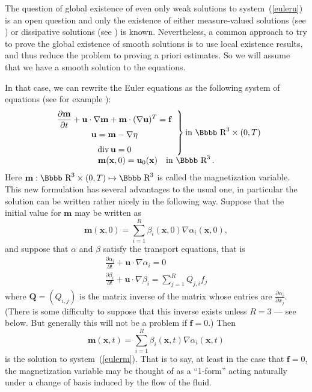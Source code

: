 \documentclass[12pt,twoside]{article}
\renewcommand {\div}{{\rm div}\,}
\newcommand {\rdd}{\mbox{\Bbbb R}}
\newcommand {\bu}{{\mathbf{u}}}
\newcommand {\bff}{{\mathbf{f}}}
\newcommand {\bx}{{\mathbf{x}}}
\newcommand {\bm}{{\mathbf{m}}}
\newcommand {\bQ}{{\mathbf{Q}}}
\newcommand {\pder}[2]{\frac {\partial #1}{\partial #2}}
\begin{document}
The question of global existence of even only weak solutions to 
system~(\ref{euleru}) is an open question and only the existence of either 
measure-valued solutions (see \cite{DPMa}) or dissipative solutions (see
\cite{Lio}) is known. Nevertheless, a common approach to try to prove 
the global existence of smooth solutions is to use local existence results,
and thus reduce the problem to proving a priori estimates.  So we will
assume that we have a smooth solution to the equations.

In that case, we can rewrite the Euler equations as the following system
of equations (see for example \cite{Ch}):
\begin{equation} \label{eulerm} 
\begin{array}{c}
\left. \begin{array}{c}
\displaystyle \pder{\bm}{t} + \bu\cdot \nabla \bm + \bm \cdot (\nabla \bu)^T = 
  \bff \\[6pt]
\bu = \bm - \nabla \eta \\[6pt]
\div \bu = 0 
\end{array} \right\} {\rm in \ } \rdd^3 \times (0,T) \\[10pt]
\bm(\bx,0) = \bu_0(\bx) \quad {\rm in \ } \rdd^3\, .
\end{array}
\end{equation}
Here $\bm:\rdd^3 \times(0,T) 
\mapsto \rdd^3$ is called the magnetization variable.  This new formulation
has several advantages to the usual one, in particular the solution
can be written rather nicely in the following way.  
Suppose that
the initial value for $\bm$ may be written as
\begin{equation}
\label{init-m-alpha-beta}
\bm(\bx,0) = \sum_{i=1}^R \beta_i(\bx,0) \nabla \alpha_i(\bx,0) ,
\end{equation}
and suppose that $\alpha$ and $\beta$ satisfy the transport equations,
that is
$$
\begin{array}{c}
\displaystyle \pder{\alpha_i}{t} + \bu \cdot \nabla \alpha_i = 0
\\[6pt]
\displaystyle \pder{\beta_i}{t} + \bu \cdot \nabla \beta_i 
= \sum_{j=1}^R Q_{j,i} f_j
\end{array}
$$
where $\bQ = (Q_{i,j})$ is the matrix inverse of the matrix whose entries are
$\pder{\alpha_i}{x_j}$.  (There is some difficulty to suppose that this
inverse exists unless $R=3$ --- see below.  But generally this will not 
be a problem if $\bff = 0$.)
Then 
$$
\bm(\bx,t) = \sum_{i=1}^R \beta_i(\bx,t) \nabla \alpha_i(\bx,t) 
$$
is the solution to system~(\ref{eulerm}).  That is to say, at least in
the case that $\bff = 0$, the 
magnetization variable may be thought of as a ``1-form'' acting 
naturally under a change of basis induced by the flow of the fluid.
\end{document}
